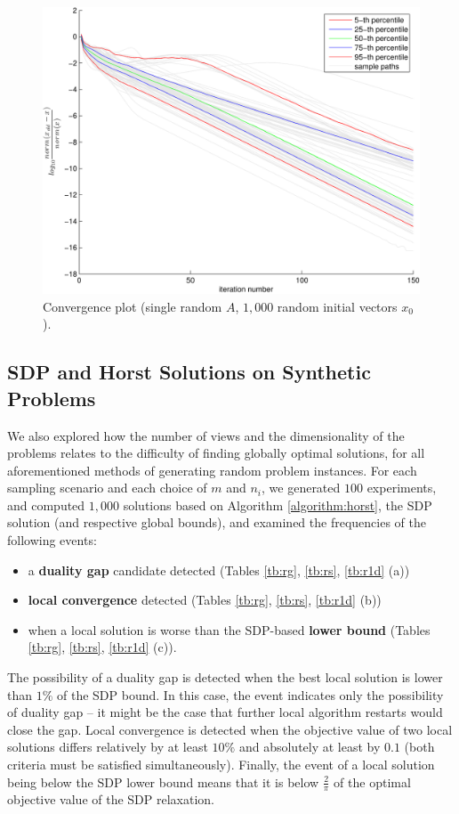 \begin{figure}[htbp]
    \centering
    \includegraphics[width=\textwidth]{figures/convergenceBoxPlotFixedA.pdf}
    \caption[Convergence rates: varying initial conditions]{Convergence plot (single random $A$, $1,000$ random initial vectors $x_0$).}
    \label{fig:qcqpConvFix}
\end{figure}

\subsection{SDP and Horst Solutions on Synthetic Problems}\label{chap:experiments:horst}

We also explored how the number of views and the dimensionality of
the problems relates to the difficulty of finding globally optimal
solutions, for all aforementioned methods of generating random problem
instances.
 For each sampling scenario and each choice of $m$ and $n_i$, we generated $100$
experiments, and computed $1,000$ solutions based on Algorithm
\ref{algorithm:horst}, the SDP solution (and respective
global bounds), and examined the frequencies of the following
events:
\begin{itemize}
\item a \textbf{duality gap} candidate detected (Tables
\ref{tb:rg}, \ref{tb:rs}, \ref{tb:r1d} (a))
\item \textbf{local convergence} detected (Tables \ref{tb:rg}, \ref{tb:rs},
\ref{tb:r1d} (b))
\item when a local solution is worse
than the SDP-based \textbf{lower bound} (Tables \ref{tb:rg},
\ref{tb:rs}, \ref{tb:r1d} (c)).
\end{itemize}
The possibility of a duality gap is
detected when the best local solution is lower than $1\%$ of the
SDP bound. In this case, the event indicates only the possibility
of duality gap -- it might be the case that further local
algorithm restarts would close the gap. Local convergence
is detected when the objective value of two local solutions
differs relatively by at least $10\%$ and absolutely at least by
$0.1$ (both criteria must be satisfied
simultaneously). Finally, the event of a local solution being
below the SDP lower bound means that it is below
$\frac{2}{\pi}$ of the optimal objective value of the SDP
relaxation.

